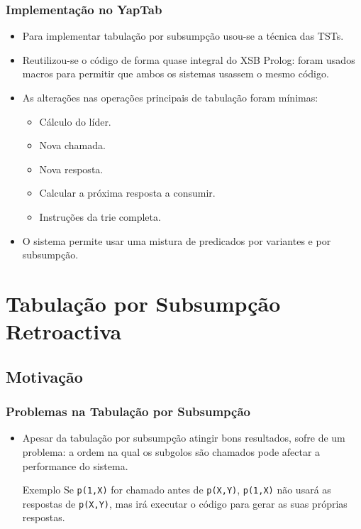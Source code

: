 \documentclass{beamer}
\begin{document}
\begin{frame}
   \frametitle{Implementação no YapTab}
   \begin{itemize}
      \item Para implementar tabulação por subsumpção usou-se a técnica das TSTs.
      \item Reutilizou-se o código de forma quase integral do XSB Prolog: foram usados macros para
      permitir que ambos os sistemas usassem o mesmo código.
      \item As alterações nas operações principais de tabulação foram mínimas:
      \begin{itemize}
         \pause
         \item Cálculo do líder.
         \pause
         \item Nova chamada.
         \pause
         \item Nova resposta.
         \pause
         \item Calcular a próxima resposta a consumir.
         \pause
         \item Instruções da trie completa.
      \end{itemize}
      \pause
      \item O sistema permite usar uma mistura de predicados por variantes e por subsumpção.
   \end{itemize}
\end{frame}

\section{Tabulação por Subsumpção Retroactiva}

\subsection{Motivação}

\begin{frame}
   \frametitle{Problemas na Tabulação por Subsumpção}
   \begin{itemize}
      \item Apesar da tabulação por subsumpção atingir bons resultados, sofre de um problema:
      a ordem na qual os subgolos são chamados pode afectar a performance do sistema.
      
      \begin{block}{Exemplo}
         Se \texttt{p(1,X)} for chamado antes de \texttt{p(X,Y)}, \texttt{p(1,X)} não usará as respostas de
         \texttt{p(X,Y)}, mas irá executar o código para gerar as suas próprias respostas.
      \end{block}

   \end{itemize}
\end{frame}
\end{document}
